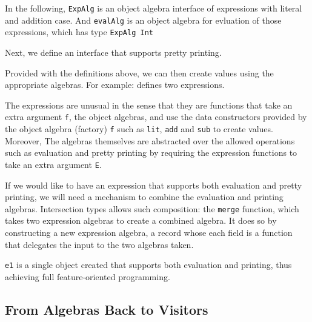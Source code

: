 In the following, \lstinline{ExpAlg} is an object algebra interface of
expressions with literal and addition case. And \lstinline{evalAlg} is an object
algebra for evluation of those expressions, which has type \lstinline{ExpAlg Int}


Next, we define an interface that supports pretty printing.


Provided with the definitions above, we can then create values using the
appropriate algebras. For example:
defines two expressions.

The expressions are unusual in the sense that they are functions that take an
extra argument \lstinline{f}, the object algebras, and use the data constructors
provided by the object algebra (factory) \lstinline{f} such as \lstinline{lit},
\lstinline{add} and \lstinline{sub} to create values. Moreover, The algebras
themselves are abstracted over the allowed operations such as evaluation and
pretty printing by requiring the expression functions to take an extra argument
\lstinline{E}.


If we would like to have an expression that supports both evaluation and pretty
printing, we will need a mechanism to combine the evaluation and printing
algebras. Intersection types allows such composition: the \lstinline{merge}
function, which takes two expression algebras to create a combined algebra. It
does so by constructing a new expression algebra, a record whose each field is a
function that delegates the input to the two algebras taken.


\lstinline{e1} is a single object created that supports both evaluation and
printing, thus achieving full feature-oriented programming.

\subsection{From Algebras Back to Visitors}

